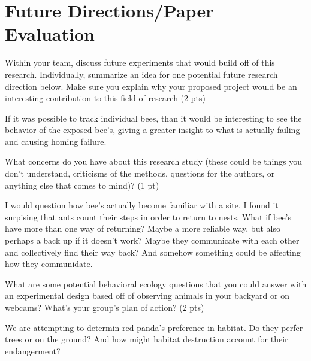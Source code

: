 \documentclass[12pt,a4paper]{article}
\begin{document}
\section*{Future Directions/Paper Evaluation}
\begin{enumerate}[font=\bfseries, wide, resume]
    {\color{under}\item  Within your team, discuss future experiments that would build off of this research. Individually, summarize an idea for one potential future research direction below. Make sure you explain why your proposed project would be an interesting contribution to this field of research (2 pts)}
    
    If it was possible to track individual bees, than it would be interesting to see the behavior of the exposed bee's, giving a greater insight to what is actually failing and causing homing failure.

    {\color{under}\item What concerns do you have about this research study (these could be things you don’t understand, criticisms of the methods, questions for the authors, or anything else that comes to mind)? (1 pt)}
    
    I would question how bee's actually become familiar with a site. I found it surpising that ants count their steps in order to return to nests. What if bee's have more than one way of returning? Maybe a more reliable way, but also perhaps a back up if it doesn't work? Maybe they communicate with each other and collectively find their way back? And somehow something could be affecting how they communidate.

    {\color{under}\item  What are some potential behavioral ecology questions that you could answer with an experimental design based off of observing animals in your backyard or on webcams? What’s your group's plan of action? (2 pts)}  

    We are attempting to determin red panda's preference in habitat. Do they perfer trees or on the ground? And how might habitat destruction account for their endangerment?
\end{enumerate}
\end{document}
